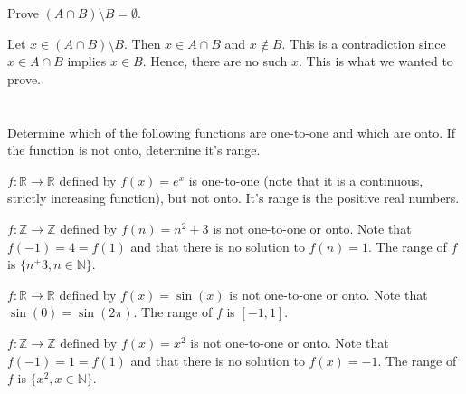 \documentclass[a4paper]{article}
\begin{document}
Prove $(A \cap B) \setminus B = \emptyset$.

\vspace{\baselineskip}

Let $ x \in (A \cap B) \setminus B$. Then $x \in A \cap B$ and $x \not\in B$. This is a contradiction since $x \in A \cap B$ implies $x \in B$. Hence, there are no such $x$. This is what we wanted to prove.


\section{}


\section{}


\section{}


\section{}


\section{}


\section{}

Determine which of the following functions are one-to-one and which are onto. If the function is not onto, determine it's range.

\vspace{\baselineskip}

$f : \mathbb{R} \rightarrow \mathbb{R}$ defined by $f(x) = e^x$ is one-to-one (note that it is a continuous, strictly increasing function), but not onto. It's range is the positive real numbers.

\vspace{\baselineskip}

$f : \mathbb{Z} \rightarrow \mathbb{Z}$ defined by $f(n) = n^2 + 3$ is not one-to-one or onto. Note that $f(-1) = 4 = f(1)$ and that there is no solution to $f(n) = 1$. The range of $f$ is $\{ n^ + 3, n \in \mathbb{N} \}$.

\vspace{\baselineskip}

$f : \mathbb{R} \rightarrow \mathbb{R}$ defined by $f(x) = \sin(x)$ is not one-to-one or onto. Note that $\sin(0) = \sin(2\pi)$. The range of $f$ is $[-1, 1]$.

\vspace{\baselineskip}

$f : \mathbb{Z} \rightarrow \mathbb{Z}$ defined by $f(x) = x^2$ is not one-to-one or onto. Note that $f(-1) = 1 = f(1)$ and that there is no solution to $f(x) = -1$. The range of $f$ is $\{ x^2, x \in \mathbb{N}\}$.
\end{document}
